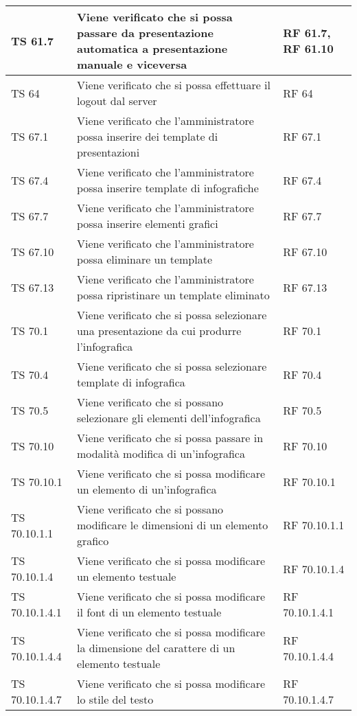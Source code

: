 {{\begin{longtable} [c]{| p{3cm} | p{6cm} |p{3cm}|}
			\hline
			TS 61.7 & Viene verificato che si possa passare da presentazione automatica a presentazione manuale e viceversa & RF 61.7, RF 61.10\\
			\hline
			TS 64 & Viene verificato che si possa effettuare il logout\ped{g} dal server\ped{g} & RF 64\\
			\hline
			TS 67.1 & Viene verificato che l'amministratore possa inserire dei template\ped{g} di presentazioni & RF 67.1\\
			\hline
			TS 67.4 & Viene verificato che l'amministratore possa inserire template\ped{g} di infografiche\ped{g} & RF 67.4\\
			\hline
			TS 67.7 & Viene verificato che l'amministratore possa inserire elementi grafici & RF 67.7\\
			\hline
			TS 67.10 & Viene verificato che l'amministratore possa eliminare un template\ped{g} & RF 67.10\\
			\hline
			TS 67.13 & Viene verificato che l'amministratore possa ripristinare un template eliminato & RF 67.13\\
			\hline
			TS 70.1 & Viene verificato che si possa selezionare una presentazione da cui produrre l'infografica\ped{g}  & RF 70.1\\
			\hline
			TS 70.4 & Viene verificato che si possa selezionare template\ped{g} di infografica\ped{g} & RF 70.4\\
			\hline
			TS 70.5 & Viene verificato che si possano selezionare gli elementi dell'infografica  & RF 70.5\\
			\hline
			TS 70.10 & Viene verificato che si possa passare in modalità modifica di un'infografica\ped{g} & RF 70.10\\
			\hline
			TS 70.10.1 & Viene verificato che si possa modificare un elemento di un'infografica\ped{g} & RF 70.10.1\\
			\hline
			TS 70.10.1.1 & Viene verificato che si possano modificare le dimensioni di un elemento grafico & RF 70.10.1.1\\
			\hline
			TS 70.10.1.4 & Viene verificato che si possa modificare un elemento testuale  & RF 70.10.1.4\\
			\hline
			TS 70.10.1.4.1 & Viene verificato che si possa modificare il font\ped{g} di un elemento testuale & RF 70.10.1.4.1\\
			\hline
			TS 70.10.1.4.4 & Viene verificato che si possa modificare la dimensione del carattere di un elemento testuale & RF 70.10.1.4.4\\
			\hline
			TS 70.10.1.4.7 & Viene verificato che si possa modificare lo stile del testo & RF 70.10.1.4.7\\

\end{longtable}}}
